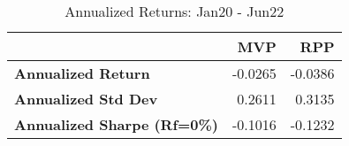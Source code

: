 \begin{table}
    \centering
      \begingroup
      \fontsize{9}{9}
      \selectfont 
\begin{tabular}{>{}lrr}
\toprule
  & MVP & RPP\\
\midrule
\textbf{Annualized Return} & -0.0265 & -0.0386\\
\textbf{Annualized Std Dev} & 0.2611 & 0.3135\\
\textbf{Annualized Sharpe (Rf=0\%)} & -0.1016 & -0.1232\\
\bottomrule
\end{tabular} \caption{Annualized Returns: Jan20 - Jun22}
      \label{tab:RPPVol2}  %
      \endgroup{}
      \end{table}